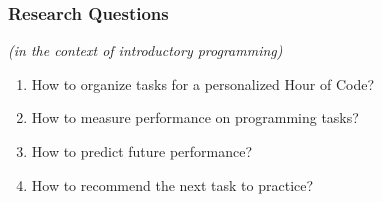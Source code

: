 \documentclass[bigger]{beamer}
\begin{document}
\begin{frame}
\end{frame}


\begin{frame}
  \frametitle{Research Questions}

  \emph{(in the context of introductory programming)}
  \begin{enumerate}
  \item How to organize tasks for a personalized Hour of Code?

  \item How to measure performance on programming tasks?

  \item How to predict future performance?

  \item How to recommend the next task to practice?
  \end{enumerate}

\end{frame}
\end{document}
